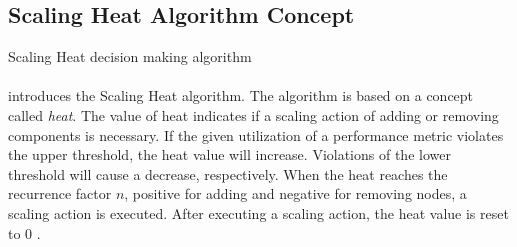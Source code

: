 \subsection{Scaling Heat Algorithm Concept}
\label{sec:04_background_scaling-heat}
\begin{algorithm}[H]
\SetAlgoLined
{}
\caption{Scaling Heat decision making algorithm\cite{Barna2017ElasticContainerApps}}
\label{alg:04_scal-heat_concept_algo}
\end{algorithm}


\paragraph{} introduces the Scaling Heat algorithm.
The algorithm is based on a concept called \textit{heat}. The value of heat indicates if a scaling action of adding or removing components is necessary.
If the given utilization of a performance metric violates the upper threshold, the heat value will increase. Violations of the lower threshold will cause a decrease, respectively.
When the heat reaches the recurrence factor $n$, positive for adding and negative for removing nodes, a scaling action is executed.
After executing a scaling action, the heat value is reset to 0 \cite{Barna2017ElasticContainerApps}.



